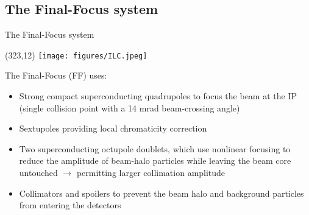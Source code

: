 \documentclass[xcolor={dvipsnames}]{beamer}
\newcommand{\ilclogo}{
  \setlength{\TPHorizModule}{1pt}
  \setlength{\TPVertModule}{1pt}
  \begin{textblock}{1}(323,12)
   \texttt{[image: figures/ILC.jpeg]}
  \end{textblock}
}
\begin{document}
\subsection{The Final-Focus system}
\begin{frame}{The Final-Focus system}
 \ilclogo
 The Final-Focus (FF) uses:
\begin{itemize}
 \item Strong compact superconducting quadrupoles to focus the
beam at the IP (single collision point with a 14 mrad beam-crossing angle)
\item Sextupoles providing local chromaticity correction
\item Two superconducting octupole doublets, which use nonlinear
focusing to reduce the amplitude of beam-halo particles while leaving the beam core untouched $\rightarrow$ permitting larger collimation amplitude
\item Collimators and spoilers to prevent the beam halo and background particles from entering the detectors
\end{itemize}
\end{frame}
\end{document}
